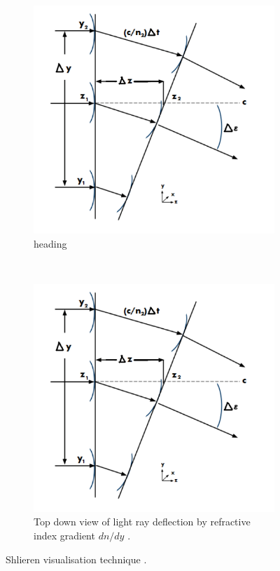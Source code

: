 \documentclass{article}
\begin{document}
\begin{figure}[H]
    \centering
    \begin{subfigure}[t]{0.48\textwidth}
        \centering
        \includegraphics[width=1\textwidth]{Mazumdar_Amrita_shlierien_refraction.png}
        \caption{heading}
        \label{fig:mirror_setup}
    \end{subfigure}
    ~
    \begin{subfigure}[t]{0.48\textwidth}
        \centering
        \includegraphics[width=1\textwidth]{Mazumdar_Amrita_shlierien_refraction.png}
        \caption{Top down view of light ray deflection by refractive index gradient $dn/dy$ \cite{Mazumdar_Amrita:2013}.}
        \label{fig:refraction_diagram}
    \end{subfigure}
    \caption{Shlieren visualisation technique \cite{Mazumdar_Amrita:2013}.}
\end{figure}
\end{document}

